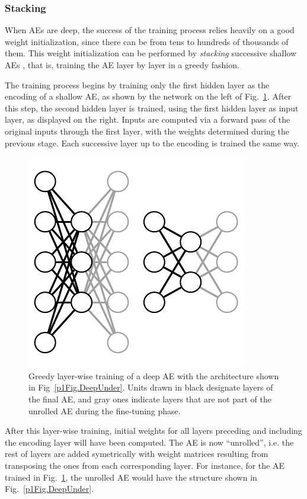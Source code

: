 \subsubsection{Stacking}

When AEs are deep, the success of the training process relies heavily on a good weight initialization, since there can be from tens to hundreds of thousands of them. This weight initialization can be performed by \textit{stacking} successive shallow AEs , that is, training the AE layer by layer in a greedy fashion.

The training process begins by training only the first hidden layer as the encoding of a shallow AE, as shown by the network on the left of Fig.~\ref{p1Fig.StackedAutoencoder}. After this step, the second hidden layer is trained, using the first hidden layer as input layer, as displayed on the right. Inputs are computed via a forward pass of the original inputs through the first layer, with the weights determined during the previous stage. Each successive layer up to the encoding is trained the same way.

\begin{figure}[ht!]
  \centering
  \includegraphics{Stacked}
  \caption{\label{p1Fig.StackedAutoencoder}Greedy layer-wise training of a deep AE with the architecture shown in Fig~\ref{p1Fig.DeepUnder}. Units drawn in black designate layers of the final AE, and gray ones indicate layers that are not part of the unrolled AE during the fine-tuning phase.}
\end{figure}

After this layer-wise training, initial weights for all layers preceding and including the encoding layer will have been computed. The AE is now ``unrolled'', i.e. the rest of layers are added symetrically with weight matrices resulting from transposing the ones from each corresponding layer. For instance, for the AE trained in Fig.~\ref{p1Fig.StackedAutoencoder}, the unrolled AE would have the structure shown in Fig.~\ref{p1Fig.DeepUnder}.

